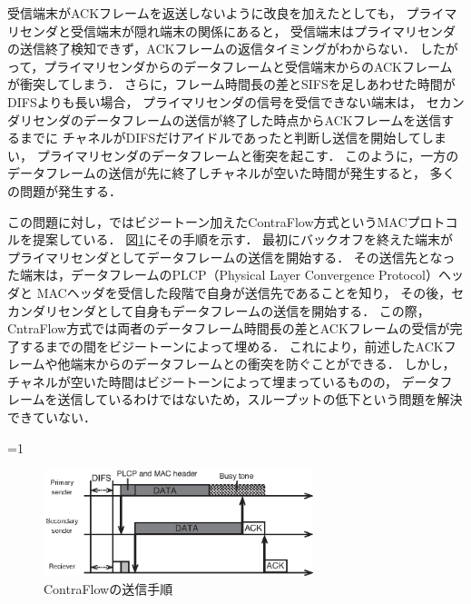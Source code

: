 \documentclass[master]{kuisthesis}		%
\newcounter{flagFig}
\begin{document}
			受信端末がACKフレームを返送しないように改良を加えたとしても，
			プライマリセンダと受信端末が隠れ端末の関係にあると，
			受信端末はプライマリセンダの送信終了検知できず，ACKフレームの返信タイミングがわからない．
			したがって，プライマリセンダからのデータフレームと受信端末からのACKフレームが衝突してしまう．
			さらに，フレーム時間長の差とSIFSを足しあわせた時間がDIFSよりも長い場合，
			プライマリセンダの信号を受信できない端末は，
			セカンダリセンダのデータフレームの送信が終了した時点からACKフレームを送信するまでに
			チャネルがDIFSだけアイドルであったと判断し送信を開始してしまい，
			プライマリセンダのデータフレームと衝突を起こす．
			このように，一方のデータフレームの送信が先に終了しチャネルが空いた時間が発生すると，
			多くの問題が発生する．

			\par
			この問題に対し，\cite{contra}ではビジートーン加えたContraFlow方式というMACプロトコルを提案している．
			図\ref{fig:contra_process}にその手順を示す．
			最初にバックオフを終えた端末がプライマリセンダとしてデータフレームの送信を開始する．
			その送信先となった端末は，データフレームのPLCP（Physical Layer Convergence Protocol）ヘッダと
			MACヘッダを受信した段階で自身が送信先であることを知り，
			その後，セカンダリセンダとして自身もデータフレームの送信を開始する．
			この際，CntraFlow方式では両者のデータフレーム時間長の差とACKフレームの受信が完了するまでの間をビジートーンによって埋める．
			これにより，前述したACKフレームや他端末からのデータフレームとの衝突を防ぐことができる．
			しかし，チャネルが空いた時間はビジートーンによって埋まっているものの，
			データフレームを送信しているわけではないため，スループットの低下という問題を解決できていない．

			\ifnum\value{flagFig}=1 {\begin{figure}[t]
				\begin{center}
					\includegraphics[width=0.7\textwidth]{fig/contra_process.eps}
					\caption{ContraFlowの送信手順}
					\label{fig:contra_process}
				\end{center}
			\end{figure}}\fi
\end{document}
